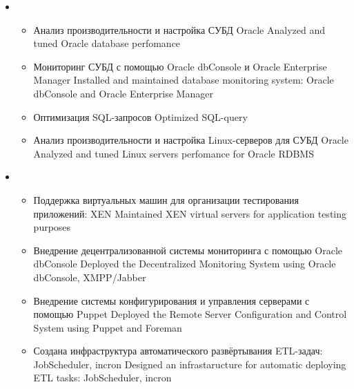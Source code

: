 \documentclass[11pt,a4paper,sans]{moderncv}        %
\begin{document}
{\begin{itemize}
\begin{itemize}
		\end{itemize}
	\item {}
		\begin{itemize}
			\item {}
				{Анализ производительности и настройка СУБД Oracle}
				{Analyzed and tuned Oracle database perfomance}
			\item {}
				{Мониторинг СУБД с помощью Oracle dbConsole и Oracle Enterprise Manager}
				{Installed and maintained database monitoring system: Oracle dbConsole and Oracle Enterprise Manager}
			\item {}
				{Оптимизация SQL-запросов}
				{Optimized SQL-query}
			\item {}
				{Анализ производительности и настройка Linux-серверов для СУБД Oracle}
				{Analyzed and tuned Linux servers perfomance for Oracle RDBMS}
		\end{itemize}
	\item {}
		\begin{itemize}
			\item {}
				{Поддержка виртуальных машин для организации тестирования приложений: XEN}
				{Maintained XEN virtual servers for application testing purposes}
			\item {}
				{Внедрение децентрализованной системы мониторинга с помощью Oracle dbConsole}
				{Deployed the Decentralized Monitoring System using Oracle dbConsole, XMPP/Jabber}
			\item {}
				{Внедрение системы конфигурирования и управления серверами с помощью Puppet}
				{Deployed the Remote Server Configuration and Control System using Puppet and Foreman}
			\item {}
				{Создана инфраструктура автоматического развёртывания ETL-задач: JobScheduler, incron}
				{Designed an infrastaructure for automatic deploying ETL tasks: JobScheduler, incron}
		\end{itemize}
	\end{itemize}
}
\end{document}
